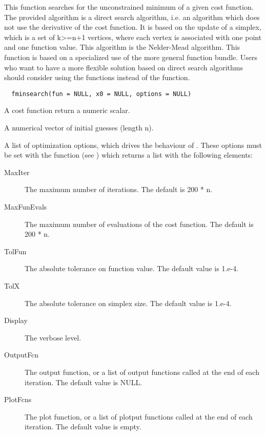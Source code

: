 %
\begin{Description}\relax
This function searches for the unconstrained minimum of a given cost function.
The provided algorithm is a direct search algorithm, i.e. an algorithm which
does not use the derivative of the cost function. It is based on the update of
a simplex, which is a set of k>=n+1 vertices, where each vertex is associated
with one point and one function value. This algorithm is the Nelder-Mead
algorithm. This function is based on a specialized use of the more general
 function bundle. Users who want to have a more flexible
solution based on direct search algorithms should consider using the
 functions instead of the  function.
\end{Description}
%
\begin{Usage}
\begin{verbatim}
  fminsearch(fun = NULL, x0 = NULL, options = NULL)
\end{verbatim}
\end{Usage}
%
\begin{Arguments}
\begin{ldescription}
\item[\code{fun}] A cost function return a numeric scalar.
\item[\code{x0}] A numerical vector of initial guesses (length n).
\item[\code{options}] A list of optimization options, which drives the behaviour of
. These options must be set with the 
function (see ) which returns a list with the following
elements: \begin{description}

\item[MaxIter] The maximum number of iterations. The default is 200 * n.
\item[MaxFunEvals] The maximum number of evaluations of the cost function.
The default is 200 * n.
\item[TolFun] The absolute tolerance on function value. The default value
is 1.e-4.
\item[TolX] The absolute tolerance on simplex size. The default value is
1.e-4.
\item[Display] The verbose level.
\item[OutputFcn] The output function, or a list of output functions
called at the end of each iteration. The default value is NULL.
\item[PlotFcns] The plot function, or a list of plotput functions called
at the end of each iteration. The default value is empty.

\end{description}


\end{ldescription}
\end{Arguments}
